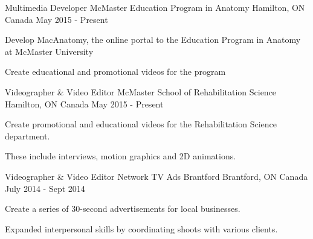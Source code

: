 


\begin{cventries}


\cventry
{Multimedia Developer} %
{McMaster Education Program in Anatomy} %
{Hamilton, ON Canada} %
{May 2015 - Present} %
{ %
	\begin{cvitems}
		\item {Develop MacAnatomy, the online portal to the Education Program 
		in Anatomy at McMaster University}
		\item {Create educational and promotional videos for the program}
	\end{cvitems}
}


\cventry
{Videographer \& Video Editor} %
{McMaster School of Rehabilitation Science} %
{Hamilton, ON Canada} %
{May 2015 - Present} %
{ %
	\begin{cvitems}
		\item {Create promotional and educational videos for the Rehabilitation 
		Science 
			department.}
		\item {These include interviews, motion graphics and 2D animations.}
	\end{cvitems}
}


\cventry
{Videographer \& Video Editor} %
{Network TV Ads Brantford} %
{Brantford, ON Canada} %
{July 2014 - Sept 2014} %
{ %
	\begin{cvitems}
		\item {Create a series of 30-second advertisements for local 
		businesses.}
		\item {Expanded interpersonal skills by coordinating shoots with 
		various clients.}
	\end{cvitems} 
}


\end{cventries}
